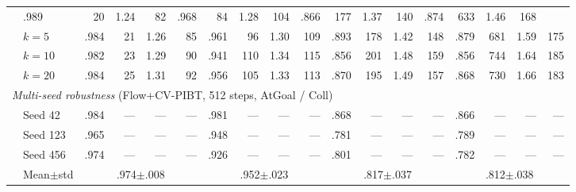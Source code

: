 \begin{table}[t]
\begin{tabular}{@{}ll rrrr rrrr rrrr rrrr@{}}
  & .989 &  20 & 1.24 &  82
  & .968 &  84 & 1.28 & 104
  & .866 & 177 & 1.37 & 140
  & .874 & 633 & 1.46 & 168 \\
& $k\!=\!5$
  & .984 &  21 & 1.26 &  85
  & .961 &  96 & 1.30 & 109
  & .893 & 178 & 1.42 & 148
  & .879 & 681 & 1.59 & 175 \\
& $k\!=\!10$
  & .982 &  23 & 1.29 &  90
  & .941 & 110 & 1.34 & 115
  & .856 & 201 & 1.48 & 159
  & .856 & 744 & 1.64 & 185 \\
& $k\!=\!20$
  & .984 &  25 & 1.31 &  92
  & .956 & 105 & 1.33 & 113
  & .870 & 195 & 1.49 & 157
  & .868 & 730 & 1.66 & 183 \\
\midrule
\multicolumn{18}{l}{\textit{Multi-seed robustness} (Flow+CV-PIBT, 512 steps, AtGoal / Coll)} \\
\cmidrule(lr){2-18}
& Seed 42
  & .984 & --- & --- & ---
  & .981 & --- & --- & ---
  & .868 & --- & --- & ---
  & .866 & --- & --- & --- \\
& Seed 123
  & .965 & --- & --- & ---
  & .948 & --- & --- & ---
  & .781 & --- & --- & ---
  & .789 & --- & --- & --- \\
& Seed 456
  & .974 & --- & --- & ---
  & .926 & --- & --- & ---
  & .801 & --- & --- & ---
  & .782 & --- & --- & --- \\
& Mean$\pm$std
  & \multicolumn{4}{c}{.974$\pm$.008}
  & \multicolumn{4}{c}{.952$\pm$.023}
  & \multicolumn{4}{c}{.817$\pm$.037}
  & \multicolumn{4}{c}{.812$\pm$.038} \\
\bottomrule
\end{tabular}
\end{table}


